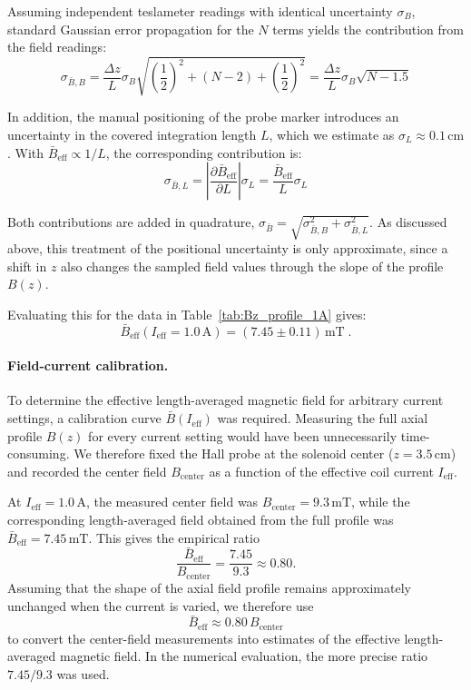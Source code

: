 \documentclass[a4paper]{article}
\begin{document}
Assuming independent teslameter readings with identical uncertainty $\sigma_B$, standard Gaussian error propagation for the $N$ terms yields the contribution from the field readings:
\begin{equation}
  \sigma_{\bar B,B} = \frac{\Delta z}{L} \sigma_B \sqrt{ \left(\frac{1}{2}\right)^2 + (N-2) + \left(\frac{1}{2}\right)^2 } = \frac{\Delta z}{L} \sigma_B \sqrt{N - 1.5}
\end{equation}

In addition, the manual positioning of the probe marker introduces an uncertainty in the covered integration length $L$, which we estimate as $\sigma_L \approx 0.1\,\mathrm{cm}$.
With $\bar B_{\mathrm{eff}}\propto 1/L$, the corresponding contribution is:
\begin{equation}
  \sigma_{\bar B,L}=\left|\frac{\partial \bar B_{\mathrm{eff}}}{\partial L}\right|\sigma_L=\frac{\bar B_{\mathrm{eff}}}{L}\sigma_L
\end{equation}

Both contributions are added in quadrature, $\sigma_{\bar B}=\sqrt{\sigma_{\bar B,B}^2+\sigma_{\bar B,L}^2}$.
As discussed above, this treatment of the positional uncertainty is only approximate, since a shift in $z$ also changes the sampled field values through the slope of the profile $B(z)$.

Evaluating this for the data in Table~\ref{tab:Bz_profile_1A} gives:
\begin{equation}
  \boxed{\bar B_{\mathrm{eff}}(I_{\mathrm{eff}}=1.0\,\mathrm{A}) = (7.45 \pm 0.11)\,\mathrm{mT}} \;.
  \label{eq:Bavg_1A_value}
\end{equation}

\paragraph{\textbf{Field-current calibration.}}

To determine the effective length-averaged magnetic field for arbitrary current settings, a calibration curve $\bar B(I_{\mathrm{eff}})$ was required.
Measuring the full axial profile $B(z)$ for every current setting would have been unnecessarily time-consuming.
We therefore fixed the Hall probe at the solenoid center ($z=3.5\,\mathrm{cm}$) and recorded the center field $B_{\mathrm{center}}$ as a function of the effective coil current $I_{\mathrm{eff}}$.

At $I_{\mathrm{eff}}=1.0\,\mathrm{A}$, the measured center field was $B_{\mathrm{center}}=9.3\,\mathrm{mT}$, while the corresponding length-averaged field obtained from the full profile was $\bar B_{\mathrm{eff}}=7.45\,\mathrm{mT}$.
This gives the empirical ratio
\[
  \frac{\bar B_{\mathrm{eff}}}{B_{\mathrm{center}}} = \frac{7.45}{9.3} \approx 0.80.
\]
Assuming that the shape of the axial field profile remains approximately unchanged when the current is varied, we therefore use
\[
  \bar B_{\mathrm{eff}} \approx 0.80\,B_{\mathrm{center}}
\]
to convert the center-field measurements into estimates of the effective length-averaged magnetic field.
In the numerical evaluation, the more precise ratio $7.45/9.3$ was used.
\end{document}
